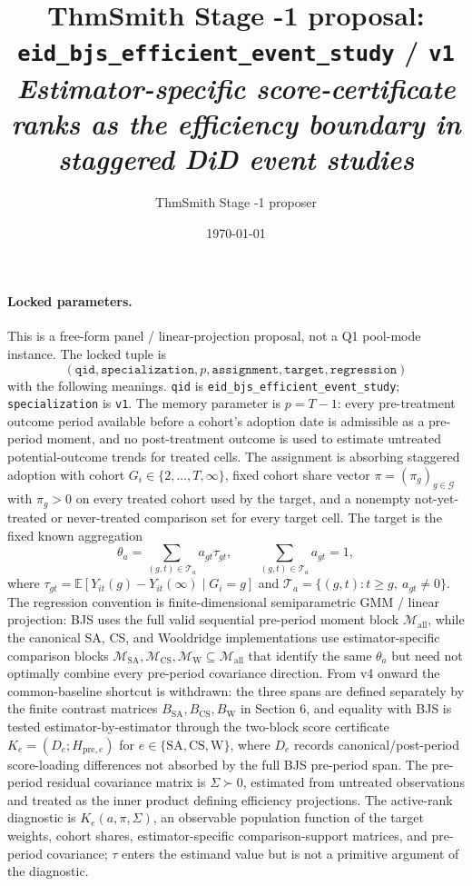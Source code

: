 \documentclass[11pt]{article}
\title{ThmSmith Stage -1 proposal: \texttt{eid\_bjs\_efficient\_event\_study} / \texttt{v1}%
  \\ \large\textit{Estimator-specific score-certificate ranks as the efficiency boundary in staggered DiD event studies}}
\author{ThmSmith Stage -1 proposer}
\date{\today}
\newcommand{\E}{\mathbb{E}}
\theoremstyle{definition}
\theoremstyle{plain}
\theoremstyle{remark}
\begin{document}
\maketitle


\paragraph{Locked parameters.}
This is a free-form panel / linear-projection proposal, not a Q1 pool-mode
instance.  The locked tuple is
\[
(\texttt{qid},\texttt{specialization},p,\texttt{assignment},\texttt{target},
\texttt{regression})
\]
with the following meanings.  \texttt{qid} is
\texttt{eid\_bjs\_efficient\_event\_study}; \texttt{specialization} is
\texttt{v1}.  The memory parameter is \(p=T-1\): every pre-treatment outcome
period available before a cohort's adoption date is admissible as a
pre-period moment, and no post-treatment outcome is used to estimate untreated
potential-outcome trends for treated cells.  The assignment is absorbing
staggered adoption with cohort \(G_i\in\{2,\ldots,T,\infty\}\), fixed cohort
share vector \(\pi=(\pi_g)_{g\in\mathcal G}\) with \(\pi_g>0\) on every
treated cohort used by the target, and a nonempty not-yet-treated or
never-treated comparison set for every target cell.  The target is the fixed
known aggregation
\[
  \theta_a=\sum_{(g,t)\in\mathcal T_a} a_{gt}\tau_{gt},\qquad
  \sum_{(g,t)\in\mathcal T_a}a_{gt}=1,
\]
where \(\tau_{gt}=\E[Y_{it}(g)-Y_{it}(\infty)\mid G_i=g]\) and
\(\mathcal T_a=\{(g,t):t\ge g,\ a_{gt}\ne0\}\).  The regression convention is
finite-dimensional semiparametric GMM / linear projection: BJS uses the full
valid sequential pre-period moment block \(\mathcal M_{\mathrm{all}}\), while
the canonical SA, CS, and Wooldridge implementations use estimator-specific
comparison blocks
\(\mathcal M_{\mathrm{SA}},\mathcal M_{\mathrm{CS}},\mathcal M_{\mathrm{W}}
\subseteq\mathcal M_{\mathrm{all}}\) that identify the same \(\theta_a\) but
need not optimally combine every pre-period covariance direction.  From v4
onward the common-baseline shortcut is withdrawn: the three spans are defined separately
by the finite contrast matrices
\(B_{\mathrm{SA}},B_{\mathrm{CS}},B_{\mathrm{W}}\) in Section 6, and equality
with BJS is tested estimator-by-estimator through the two-block score
certificate \(K_e=(D_e;H_{\mathrm{pre},e})\) for
\(e\in\{\mathrm{SA},\mathrm{CS},\mathrm{W}\}\), where \(D_e\) records
canonical/post-period score-loading differences not absorbed by the full BJS
pre-period span.  The pre-period residual covariance matrix is
\(\Sigma\succ0\), estimated from untreated observations and treated as the
inner product defining efficiency projections.  The active-rank diagnostic is
\(K_e(a,\pi,\Sigma)\), an observable population function of the target
weights, cohort shares, estimator-specific comparison-support matrices, and
pre-period covariance; \(\tau\) enters the estimand value but is not a
primitive argument of the diagnostic.
\end{document}
